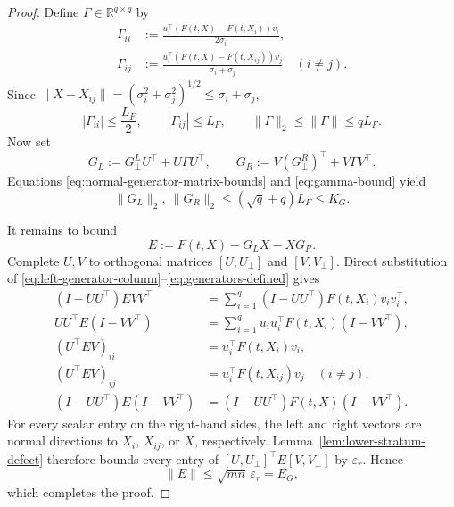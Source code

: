 \documentclass[]{article}
\numberwithin{equation}{section}
\theoremstyle{plain}
\theoremstyle{remark}
\numberwithin{algorithm}{section}
\newcommand{\R}{\mathbb{R}}
\newcommand{\eps}{\varepsilon}
\begin{document}
\begin{proof}
Define \(\Gamma\in\R^{q\times q}\) by
\begin{align}
 \Gamma_{ii}
 &:=\frac{u_i^\top(F(t,X)-F(t,X_i))v_i}{2\sigma_i},
                                                               \label{eq:gamma-diagonal}\\
 \Gamma_{ij}
 &:=\frac{u_i^\top(F(t,X)-F(t,X_{ij}))v_j}
          {\sigma_i+\sigma_j}
 \quad(i\ne j).                                      \label{eq:gamma-offdiagonal}
\end{align}
Since
\(\|X-X_{ij}\|=(\sigma_i^2+\sigma_j^2)^{1/2}
\le\sigma_i+\sigma_j\),
\begin{equation}\label{eq:gamma-bound}
 |\Gamma_{ii}|\le\frac{L_F}{2},\qquad
 |\Gamma_{ij}|\le L_F,\qquad
 \|\Gamma\|_2\le\|\Gamma\|\le qL_F.
\end{equation}
Now set
\begin{equation}\label{eq:generators-defined}
 G_L:=G_\perp^LU^\top+U\Gamma U^\top,
 \qquad
 G_R:=V(G_\perp^R)^\top+V\Gamma V^\top.
\end{equation}
Equations \eqref{eq:normal-generator-matrix-bounds} and
\eqref{eq:gamma-bound} yield
\begin{equation}\label{eq:generators-norm}
 \|G_L\|_2,\ \|G_R\|_2
 \le(\sqrt q+q)L_F\le K_G.
\end{equation}

It remains to bound
\begin{equation}\label{eq:generator-residual-defined}
 E:=F(t,X)-G_LX-XG_R.
\end{equation}
Complete \(U,V\) to orthogonal matrices \([U,U_\perp]\) and
\([V,V_\perp]\).  Direct substitution of
\eqref{eq:left-generator-column}--\eqref{eq:generators-defined} gives
\begin{align}
 (I-UU^\top)EVV^\top
 &=\sum_{i=1}^q (I-UU^\top)F(t,X_i)v_i v_i^\top,       \label{eq:residual-left-normal}\\
 UU^\top E(I-VV^\top)
 &=\sum_{i=1}^q u_i u_i^\top F(t,X_i)(I-VV^\top),      \label{eq:residual-right-normal}\\
 (U^\top EV)_{ii}
 &=u_i^\top F(t,X_i)v_i,                              \label{eq:residual-core-diagonal}\\
 (U^\top EV)_{ij}
 &=u_i^\top F(t,X_{ij})v_j\quad(i\ne j),              \label{eq:residual-core-offdiagonal}\\
 (I-UU^\top)E(I-VV^\top)
 &=(I-UU^\top)F(t,X)(I-VV^\top).                       \label{eq:residual-normal-normal}
\end{align}
For every scalar entry on the right-hand sides, the left and right vectors
are normal directions to \(X_i\), \(X_{ij}\), or \(X\), respectively.
Lemma~\ref{lem:lower-stratum-defect} therefore bounds every entry of
\([U,U_\perp]^\top E[V,V_\perp]\) by \(\eps_r\).  Hence
\begin{equation}\label{eq:generator-residual-bound}
 \|E\|\le\sqrt{mn}\,\eps_r=E_G,
\end{equation}
which completes the proof.
\end{proof}
\end{document}
